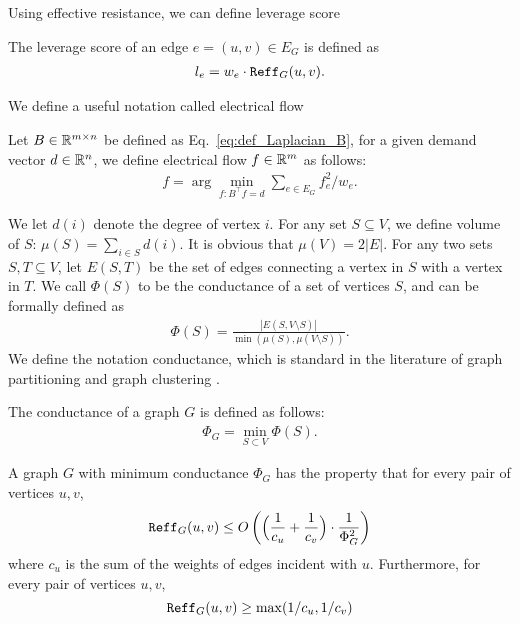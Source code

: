 Using effective resistance, we can define leverage score
\begin{definition}\label{def:leverage_score}
The leverage score of an edge $e = (u,v) \in E_G$ is defined as 
\begin{align*}
l_e = w_e \cdot \mathtt{Reff}_G(u,v).
\end{align*}
\end{definition}

We define a useful notation called electrical flow
\begin{definition}\label{def:electrical_flow}
Let $B \in {\mathbb R}^{m \times n}$ be defined as Eq.~\eqref{eq:def_Laplacian_B}, for a given demand vector $d \in {\mathbb R}^n$, we define electrical flow $f \in {\mathbb R}^m$ as follows:
\begin{align*}
f = \arg\min_{ f : B^\top f = d } \sum_{ e \in E_G } f_e^2 /w_e .
\end{align*}
\end{definition}

We let $d(i)$ denote the degree of vertex $i$. For any set $S \subseteq V$, we define volume of $S$: $\mu(S) = \sum_{i \in S} d(i)$. It is obvious that $\mu(V) = 2|E|$. For any two sets $S, T \subseteq V$, let $E(S,T)$ be the set of edges connecting a vertex in $S$ with a vertex in $T$. We call $\Phi(S)$ to be the conductance of a set of vertices $S$, and can be formally defined as
\begin{align*}
\Phi(S) = \frac{ | E(S, V \setminus S) | }{ \min ( \mu (S) , \mu ( V \setminus S ) ) }.
\end{align*}
We define the notation conductance, which is standard in the literature of graph partitioning and graph clustering \cite{st04,kvv04,acl06,ap09,lrtv11,zlm13,lz14}.
\begin{definition}[Conductance]\label{def:conductance}
The conductance of a graph $G$ is defined as follows:
\begin{align*}
\Phi_G = \min_{ S \subset V } \Phi(S).
\end{align*}
\end{definition}

\begin{lemma}\label{lem:conductance_cut}
A graph $G$ with minimum conductance $\Phi_G$ has the property that for every pair of vertices $u,v$,
\begin{align*}
\mathtt{Reff}_G(u,v)\le O \left( \Big( \frac{1}{c_u} + \frac{1}{c_v} \Big) \cdot \frac{1}{\Phi_G^2} \right)
\end{align*}
where $c_u$ is the sum of the weights of edges incident with $u$. Furthermore, for every pair of vertices $u,v$,
$$\mathtt{Reff}_G(u,v)\ge \max(1/c_u,1/c_v)$$
\end{lemma}

